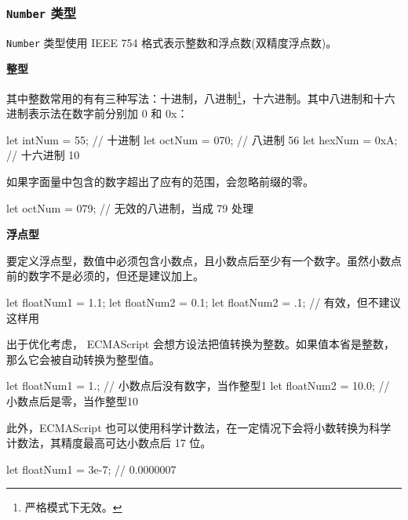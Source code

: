 \subsubsection{\texttt{Number} 类型}

\texttt{Number} 类型使用 IEEE 754 格式表示整数和浮点数(双精度浮点数)。

\noindent\textbf{整型}

其中整数常用的有有三种写法：十进制，八进制\footnote{严格模式下无效。}，十六进制。其中八进制和十六进制表示法在数字前分别加 0 和 0x：

\begin{JavaScript}
let intNum = 55;    // 十进制
let octNum = 070;   // 八进制 56
let hexNum = 0xA;   // 十六进制 10
\end{JavaScript}

如果字面量中包含的数字超出了应有的范围，会忽略前缀的零。

\begin{JavaScript}
let octNum = 079;   // 无效的八进制，当成 79 处理
\end{JavaScript}


\noindent\textbf{浮点型}

要定义浮点型，数值中必须包含小数点，且小数点后至少有一个数字。虽然小数点前的数字不是必须的，但还是建议加上。

\begin{JavaScript}
let floatNum1 = 1.1;
let floatNum2 = 0.1;
let floatNum2 = .1;     // 有效，但不建议这样用
\end{JavaScript}

出于优化考虑， ECMAScript 会想方设法把值转换为整数。如果值本省是整数，那么它会被自动转换为整型值。

\begin{JavaScript}
let floatNum1 = 1.;     // 小数点后没有数字，当作整型1
let floatNum2 = 10.0;   // 小数点后是零，当作整型10
\end{JavaScript}

此外，ECMAScript 也可以使用科学计数法，在一定情况下会将小数转换为科学计数法，其精度最高可达小数点后 17 位。

\begin{JavaScript}
let floatNum1 = 3e-7;   // 0.0000007
\end{JavaScript}

